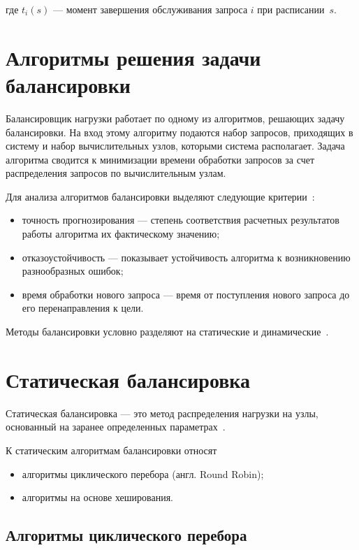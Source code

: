 где $t_i(s)$ --- момент завершения обслуживания запроса $i$ при расписании~$s$.

\section{Алгоритмы решения задачи балансировки}

Балансировщик нагрузки работает по одному из алгоритмов, решающих задачу балансировки.
На вход этому алгоритму подаются набор запросов, приходящих в систему и набор вычислительных узлов, которыми система располагает.
Задача алгоритма сводится к минимизации времени обработки запросов за счет распределения запросов по вычислительным узлам.

Для анализа алгоритмов балансировки выделяют следующие критерии~\cite{com_analysis}:
\begin{itemize}
	\item точность прогнозирования --- степень соответствия расчетных результатов работы алгоритма их фактическому значению;  
	\item отказоустойчивость --- показывает устойчивость
	алгоритма к возникновению разнообразных ошибок;
	\item время обработки нового запроса --- время от поступления нового запроса до его перенаправления к цели.
\end{itemize}

Методы балансировки условно разделяют на статические и динамические~\cite{drr, com_analysis, rate_comp}. 

\section{Статическая балансировка}

Статическая балансировка --- это метод распределения нагрузки на узлы, основанный на заранее определенных параметрах~\cite{com_analysis, intuit}.

К статическим алгоритмам балансировки относят~\mbox{\cite{nginx, aws, haproxy, part_algos, com_analysis}}
\begin{itemize}
	\item алгоритмы циклического перебора (англ. Round Robin);
	\item алгоритмы на основе хеширования.
\end{itemize}


\subsection{Алгоритмы циклического перебора}

